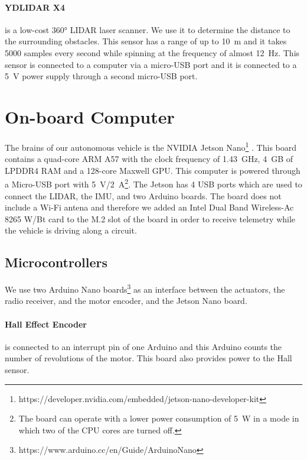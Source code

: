 \paragraph{YDLIDAR X4} is a low-cost \ang{360} \gls{LIDAR} laser scanner. We use it to determine the distance to the surrounding obstacles. This sensor has a range of up to \SI{10}{\meter} and it takes \num{5000} samples every second while spinning at the frequency of almost \SI{12}{\hertz}. This sensor is connected to a computer via a micro-USB port and it is connected to a \SI{5}{\volt} power supply through a second micro-USB port.

\section{On-board Computer}

The brains of our autonomous vehicle is the NVIDIA Jetson Nano\footnote{https://developer.nvidia.com/embedded/jetson-nano-developer-kit} . This board contains a quad-core ARM A57 with the clock frequency of \SI{1.43}{\giga\hertz}, \SI{4}{\giga B} of LPDDR4 RAM and a 128-core Maxwell GPU. This computer is powered through a Micro-USB port with \SI{5}{\volt}/\SI{2}{\ampere}\footnote{The board can operate with a lower power consumption of \SI{5}{\watt} in a mode in which two of the CPU cores are turned off.}. The Jetson has 4 USB ports which are used to connect the \gls*{LIDAR}, the \gls*{IMU}, and two Arduino boards. The board does not include a Wi-Fi antena and therefore we added an Intel Dual Band Wireless-Ac 8265 W/Bt card to the M.2 slot of the board in order to receive telemetry while the vehicle is driving along a circuit.

\subsection{Microcontrollers}

We use two Arduino Nano boards\footnote{https://www.arduino.cc/en/Guide/ArduinoNano} as an interface between the actuators, the radio receiver, and the motor encoder, and the Jetson Nano board.

\paragraph{Hall Effect Encoder} is connected to an interrupt pin of one Arduino and this Arduino counts the number of revolutions of the motor. This board also provides power to the Hall sensor.

